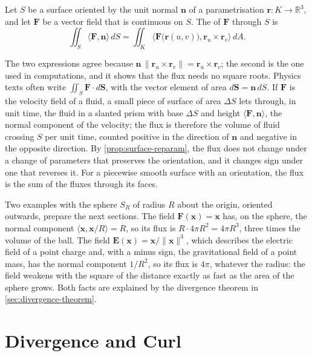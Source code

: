\begin{definition}[Flux]
\label{def:flux}
Let $S$ be a surface oriented by the unit normal $\mathbf n$ of a parametrisation $\mathbf r\colon K\to\mathbb R^3$, and let $\mathbf F$ be a vector field that is continuous on $S$. The  of $\mathbf F$ through $S$ is
\[
\iint_S\langle\mathbf F,\mathbf n\rangle\,dS=\iint_K\bigl\langle\mathbf F\bigl(\mathbf r(u,v)\bigr),\mathbf r_u\times\mathbf r_v\bigr\rangle\,dA .
\]
\end{definition}

The two expressions agree because $\mathbf n\,\|\mathbf r_u\times\mathbf r_v\|=\mathbf r_u\times\mathbf r_v$; the second is the one used in computations, and it shows that the flux needs no square roots. Physics texts often write $\iint_S\mathbf F\cdot d\mathbf S$, with the vector element of area $d\mathbf S=\mathbf n\,dS$. If $\mathbf F$ is the velocity field of a fluid, a small piece of surface of area $\Delta S$ lets through, in unit time, the fluid in a slanted prism with base $\Delta S$ and height $\langle\mathbf F,\mathbf n\rangle$, the normal component of the velocity; the flux is therefore the volume of fluid crossing $S$ per unit time, counted positive in the direction of $\mathbf n$ and negative in the opposite direction. By \cref{prop:surface-reparam}, the flux does not change under a change of parameters that preserves the orientation, and it changes sign under one that reverses it. For a piecewise smooth surface with an orientation, the flux is the sum of the fluxes through its faces.

Two examples with the sphere $S_R$ of radius $R$ about the origin, oriented outwards, prepare the next sections. The field $\mathbf F(\mathbf x)=\mathbf x$ has, on the sphere, the normal component $\langle\mathbf x,\mathbf x/R\rangle=R$, so its flux is $R\cdot4\pi R^2=4\pi R^3$, three times the volume of the ball. The field $\mathbf E(\mathbf x)=\mathbf x/\|\mathbf x\|^3$, which describes the electric field of a point charge and, with a minus sign, the gravitational field of a point mass, has the normal component $1/R^2$, so its flux is $4\pi$, whatever the radius: the field weakens with the square of the distance exactly as fast as the area of the sphere grows. Both facts are explained by the divergence theorem in \cref{sec:divergence-theorem}.

\section{Divergence and Curl}
\label{sec:div-curl}

